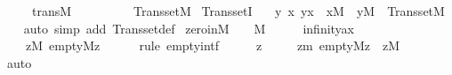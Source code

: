 \begin{isabellebody}
\ \ \ \ \ trans{\isacharunderscore}{\kern0pt}M{\isacharcolon}{\kern0pt}\ \ \ \ \ \ \ \ \ \ {\isachardoublequoteopen}Transset{\isacharparenleft}{\kern0pt}M{\isacharparenright}{\kern0pt}{\isachardoublequoteclose}\isanewline
{}\isanewline
\isanewline
\isanewline
{}\isamarkupfalse%
\ TranssetI\ {\isacharcolon}{\kern0pt}\isanewline
\ \ {\isachardoublequoteopen}{\isacharparenleft}{\kern0pt}{\isasymAnd}y\ x{\isachardot}{\kern0pt}\ y{\isasymin}x\ {\isasymLongrightarrow}\ x{\isasymin}M\ {\isasymLongrightarrow}\ y{\isasymin}M{\isacharparenright}{\kern0pt}\ {\isasymLongrightarrow}\ Transset{\isacharparenleft}{\kern0pt}M{\isacharparenright}{\kern0pt}{\isachardoublequoteclose}\isanewline
%
\isadelimproof
\ \ %
\endisadelimproof
%
\isatagproof
{}\isamarkupfalse%
\ {\isacharparenleft}{\kern0pt}auto\ simp\ add{\isacharcolon}{\kern0pt}\ Transset{\isacharunderscore}{\kern0pt}def{\isacharparenright}{\kern0pt}%
\endisatagproof
{\isafoldproof}%
%
\isadelimproof
\isanewline
%
\endisadelimproof
\isanewline
{}\isamarkupfalse%
\ zero{\isacharunderscore}{\kern0pt}in{\isacharunderscore}{\kern0pt}M{\isacharcolon}{\kern0pt}\ \ {\isachardoublequoteopen}{}\ {\isasymin}\ M{\isachardoublequoteclose}\isanewline
%
\isadelimproof
%
\endisadelimproof
%
\isatagproof
{}\isamarkupfalse%
\ {\isacharminus}{\kern0pt}\isanewline
\ \ \isamarkupfalse%
\ infinity{\isacharunderscore}{\kern0pt}ax\ \isamarkupfalse%
\isanewline
\ \ \ \ {\isachardoublequoteopen}{\isacharparenleft}{\kern0pt}{\isasymexists}z{\isacharbrackleft}{\kern0pt}{\isacharhash}{\kern0pt}{\isacharhash}{\kern0pt}M{\isacharbrackright}{\kern0pt}{\isachardot}{\kern0pt}\ empty{\isacharparenleft}{\kern0pt}{\isacharhash}{\kern0pt}{\isacharhash}{\kern0pt}M{\isacharcomma}{\kern0pt}z{\isacharparenright}{\kern0pt}{\isacharparenright}{\kern0pt}{\isachardoublequoteclose}\isanewline
\ \ \ \ \isamarkupfalse%
\ {\isacharparenleft}{\kern0pt}rule\ empty{\isacharunderscore}{\kern0pt}intf{\isacharparenright}{\kern0pt}\isanewline
\ \ \isamarkupfalse%
\ \isamarkupfalse%
\ z\ \isanewline
\ \ \ \ zm{\isacharcolon}{\kern0pt}\ {\isachardoublequoteopen}empty{\isacharparenleft}{\kern0pt}{\isacharhash}{\kern0pt}{\isacharhash}{\kern0pt}M{\isacharcomma}{\kern0pt}z{\isacharparenright}{\kern0pt}{\isachardoublequoteclose}\ \ {\isachardoublequoteopen}z{\isasymin}M{\isachardoublequoteclose}\isanewline
\ \ \ \ \isamarkupfalse%
\ auto\isanewline
\ \ \isamarkupfalse%

\end{isabellebody}
